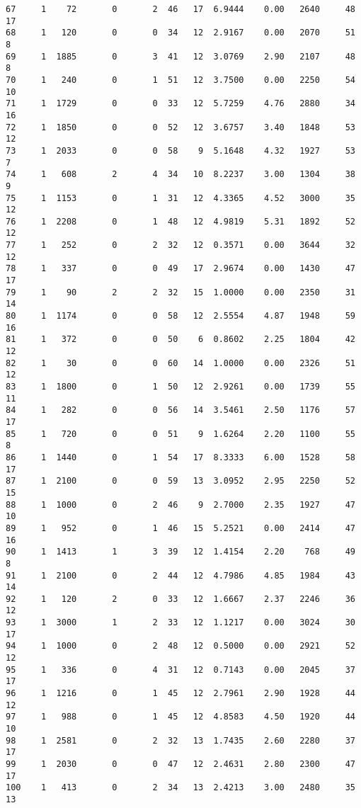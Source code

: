 \documentclass[
  letterpaper,
  DIV=11,
  numbers=noendperiod]{scrreprt}
\begin{document}
\begin{verbatim}
67     1    72       0       2  46   17  6.9444    0.00   2640     48      17
68     1   120       0       0  34   12  2.9167    0.00   2070     51       8
69     1  1885       0       3  41   12  3.0769    2.90   2107     48       8
70     1   240       0       1  51   12  3.7500    0.00   2250     54      10
71     1  1729       0       0  33   12  5.7259    4.76   2880     34      16
72     1  1850       0       0  52   12  3.6757    3.40   1848     53      12
73     1  2033       0       0  58    9  5.1648    4.32   1927     53       7
74     1   608       2       4  34   10  8.2237    3.00   1304     38       9
75     1  1153       0       1  31   12  4.3365    4.52   3000     35      12
76     1  2208       0       1  48   12  4.9819    5.31   1892     52      12
77     1   252       0       2  32   12  0.3571    0.00   3644     32      12
78     1   337       0       0  49   17  2.9674    0.00   1430     47      17
79     1    90       2       2  32   15  1.0000    0.00   2350     31      14
80     1  1174       0       0  58   12  2.5554    4.87   1948     59      16
81     1   372       0       0  50    6  0.8602    2.25   1804     42      12
82     1    30       0       0  60   14  1.0000    0.00   2326     51      12
83     1  1800       0       1  50   12  2.9261    0.00   1739     55      11
84     1   282       0       0  56   14  3.5461    2.50   1176     57      17
85     1   720       0       0  51    9  1.6264    2.20   1100     55       8
86     1  1440       0       1  54   17  8.3333    6.00   1528     58      17
87     1  2100       0       0  59   13  3.0952    2.95   2250     52      15
88     1  1000       0       2  46    9  2.7000    2.35   1927     47      10
89     1   952       0       1  46   15  5.2521    0.00   2414     47      16
90     1  1413       1       3  39   12  1.4154    2.20    768     49       8
91     1  2100       0       2  44   12  4.7986    4.85   1984     43      14
92     1   120       2       0  33   12  1.6667    2.37   2246     36      12
93     1  3000       1       2  33   12  1.1217    0.00   3024     30      17
94     1  1000       0       2  48   12  0.5000    0.00   2921     52      12
95     1   336       0       4  31   12  0.7143    0.00   2045     37      17
96     1  1216       0       1  45   12  2.7961    2.90   1928     44      12
97     1   988       0       1  45   12  4.8583    4.50   1920     44      10
98     1  2581       0       2  32   13  1.7435    2.60   2280     37      17
99     1  2030       0       0  47   12  2.4631    2.80   2300     47      17
100    1   413       0       2  34   13  2.4213    3.00   2480     35      13

\end{verbatim}
\end{document}
